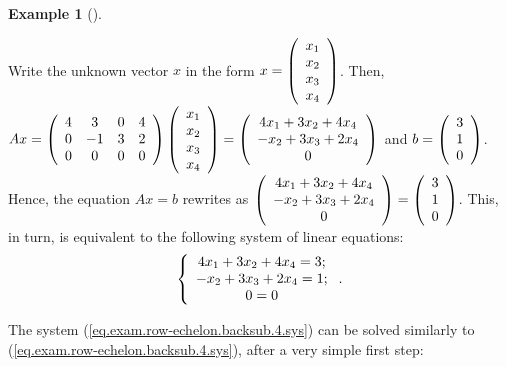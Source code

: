 \documentclass[numbers=enddot,12pt,final,onecolumn,notitlepage]{scrartcl}%
\theoremstyle{definition}
\newtheorem{exam}[theo]{Example}
\newenvironment{example}[1][]
{\begin{exam}[#1]\begin{leftbar}}
{\end{leftbar}\end{exam}}
\begin{document}
\begin{example}
Write the unknown vector $x$ in the form $x=\left(
\begin{array}
[c]{c}%
x_{1}\\
x_{2}\\
x_{3}\\
x_{4}%
\end{array}
\right)  $. Then, $Ax=\left(
\begin{array}
[c]{cccc}%
4 & 3 & 0 & 4\\
0 & -1 & 3 & 2\\
0 & 0 & 0 & 0
\end{array}
\right)  \left(
\begin{array}
[c]{c}%
x_{1}\\
x_{2}\\
x_{3}\\
x_{4}%
\end{array}
\right)  =\left(
\begin{array}
[c]{c}%
4x_{1}+3x_{2}+4x_{4}\\
-x_{2}+3x_{3}+2x_{4}\\
0
\end{array}
\right)  $ and $b=\left(
\begin{array}
[c]{c}%
3\\
1\\
0
\end{array}
\right)  $. Hence, the equation $Ax=b$ rewrites as $\left(
\begin{array}
[c]{c}%
4x_{1}+3x_{2}+4x_{4}\\
-x_{2}+3x_{3}+2x_{4}\\
0
\end{array}
\right)  =\left(
\begin{array}
[c]{c}%
3\\
1\\
0
\end{array}
\right)  $. This, in turn, is equivalent to the following system of linear
equations:%
\begin{equation}
\left\{
\begin{array}
[c]{c}%
4x_{1}+3x_{2}+4x_{4}=3;\\
-x_{2}+3x_{3}+2x_{4}=1;\\
0=0
\end{array}
\right.  . \label{eq.exam.row-echelon.backsub.4.sys}%
\end{equation}


The system (\ref{eq.exam.row-echelon.backsub.4.sys}) can be solved similarly
to (\ref{eq.exam.row-echelon.backsub.4.sys}), after a very simple first step:


\end{example}
\end{document}

